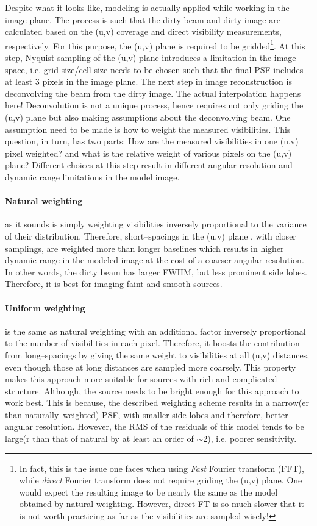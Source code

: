 \documentclass[paper=a4, fontsize=11pt]{scrartcl} %
\numberwithin{equation}{section} %
\numberwithin{figure}{section} %
\numberwithin{table}{section} %
\begin{document}
Despite what it looks like, modeling is actually applied while working in the image plane. The process is such that the dirty beam and dirty image are calculated based on the (u,v) coverage and direct visibility measurements, respectively. For this purpose, the (u,v) plane is required to be gridded\footnote{In fact, this is the issue one faces when using \emph{Fast} Fourier transform (FFT), while \emph{direct} Fourier transform does not require griding the (u,v) plane. One would expect the resulting image to be nearly the same as the model obtained by natural weighting. However, direct FT is so much slower that it is not worth practicing as far as the visibilities are sampled wisely!}. At this step, Nyquist sampling of the (u,v) plane introduces a limitation in the image space, i.e. grid size/cell size needs to  be chosen such that the final PSF includes at least 3 pixels in the image plane. The next step in image reconstruction is deconvolving the beam from the dirty image. The actual interpolation happens here! Deconvolution is not a unique process, hence requires not only griding the (u,v) plane but also making assumptions about the deconvolving beam. One assumption need to be made is how to weight the measured visibilities. This question, in turn, has two parts: How are the measured visibilities in one (u,v) pixel weighted? and what is the relative weight of various pixels on the (u,v) plane? Different choices at this step result in different angular resolution and dynamic range limitations in the model image.

\paragraph*{Natural weighting} as it sounds is simply weighting visibilities inversely proportional to the variance of their distribution.
Therefore, short--spacings in the (u,v) plane , with closer samplings, are weighted more than longer baselines which results in higher dynamic range in the modeled image at the cost of a coarser angular resolution. In other words, the dirty beam has larger FWHM, but less prominent side lobes. Therefore, it is best for imaging faint and smooth sources.

\paragraph*{Uniform weighting} is the same as natural weighting with an additional factor inversely proportional to the number of visibilities in each pixel. Therefore, it boosts the contribution from long--spacings by giving the same weight to visibilities at all (u,v) distances, even though those at long distances are sampled more coarsely. This property makes this approach more suitable for sources with rich and complicated structure. Although, the source needs to be bright enough for this approach to work best. This is because, the described weighting scheme results in a narrow(er than naturally--weighted) PSF, with smaller side lobes and therefore, better angular resolution. However, the RMS of the residuals of this model tends to be large(r than that of natural by at least an order of $\sim 2$), i.e. poorer sensitivity.
\end{document}
